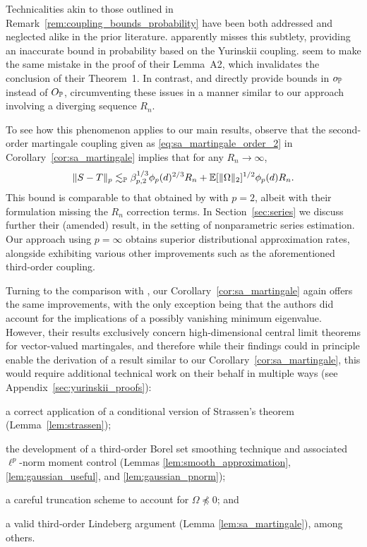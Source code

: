 Technicalities akin to those outlined in
Remark~\ref{rem:coupling_bounds_probability} have been both addressed and
neglected alike in the prior literature. \citet[Chapter 10.4, Example
16]{pollard2002user} apparently misses this subtlety, providing an
inaccurate bound in probability based on the Yurinskii coupling.
\citet{li2020uniform} seem to make the same mistake in the proof of their
Lemma~A2, which invalidates the conclusion of their Theorem~1. In contrast,
\citet{belloni2015some} and \citet{belloni2019conditional} directly provide
bounds in $o_\P$ instead of $O_\P$, circumventing these issues in a manner
similar to our approach involving a diverging sequence $R_n$.

To see how this phenomenon applies to our main results, observe that the
second-order martingale coupling given as \eqref{eq:sa_martingale_order_2} in
Corollary~\ref{cor:sa_martingale} implies that for any $R_n \to \infty$,
%
\begin{align*}
  \|S - T\|_p
  \lesssim_\P
  \beta_{p,2}^{1/3}
  \phi_p(d)^{2/3} R_n
  + \E[\|\Omega\|_2]^{1/2}
  \phi_p(d) R_n.
\end{align*}
%
This bound is comparable to that obtained by \citet[Theorem~1]{li2020uniform}
with $p=2$, albeit with their formulation missing the $R_n$ correction terms.
In Section~\ref{sec:series} we discuss further their (amended) result, in the
setting of nonparametric series estimation. Our approach using
$p = \infty$ obtains superior distributional approximation rates, alongside
exhibiting various other improvements such as the aforementioned third-order
coupling.

Turning to the comparison with \citet{belloni2018high}, our
Corollary~\ref{cor:sa_martingale} again offers the same improvements, with the
only exception being that the authors did account for the implications of a
possibly vanishing minimum eigenvalue. However, their results exclusively
concern high-dimensional central limit theorems for vector-valued martingales,
and therefore while their findings
could in principle enable the derivation of a result similar to our
Corollary~\ref{cor:sa_martingale}, this would require additional technical work
on their behalf in multiple ways
(see
Appendix~\ref{sec:yurinskii_proofs}):
%
\begin{inlineroman}
\item a correct application of a conditional
  version of Strassen's theorem
  (Lemma~\ref{lem:strassen});
\item the development of a third-order Borel set smoothing technique and
  associated $\ell^p$-norm moment control
  (Lemmas \ref{lem:smooth_approximation},
  \ref{lem:gaussian_useful}, and \ref{lem:gaussian_pnorm});
\item a careful truncation scheme to account for
  $\Omega\npreceq0$; and
\item a valid third-order Lindeberg argument
  (Lemma \ref{lem:sa_martingale}),
  among others.
\end{inlineroman}

